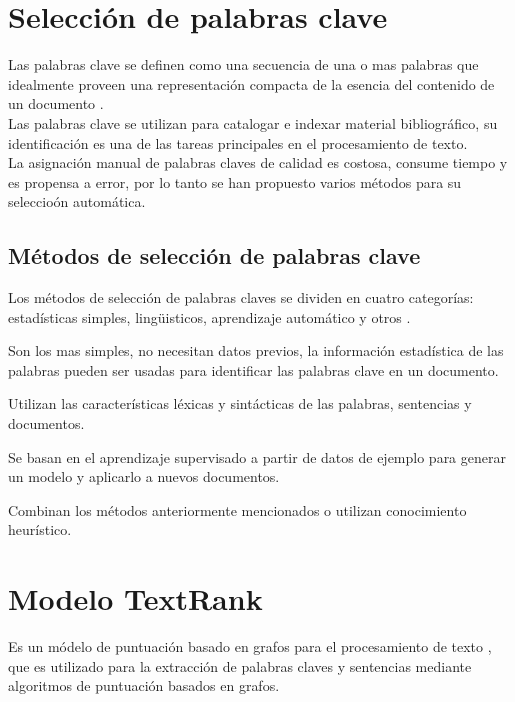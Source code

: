 \section{Selecci\'on de palabras clave}
Las palabras clave se definen como una secuencia de una o mas palabras que idealmente
proveen una representaci\'on compacta de la esencia del contenido de un 
documento \cite{REC10}. \\

Las palabras clave se utilizan para catalogar e indexar material bibliogr\'afico,
su identificaci\'on es una de las tareas principales en el procesamiento de texto. \\

La asignaci\'on manual de palabras claves de calidad es costosa, consume tiempo y es
propensa a error, por lo tanto se han propuesto varios m\'etodos para su seleccio\'on
autom\'atica.

\subsection{M\'etodos de selecci\'on de palabras clave}
Los m\'etodos de selecci\'on de palabras claves se dividen en cuatro categor\'ias:
estad\'isticas simples, ling\"uisticos, aprendizaje autom\'atico y otros \cite{ZWW08}.
\begin{description}[leftmargin=0cm]
	\item[Enfoques estad\'isticos] Son los mas simples, no necesitan datos previos,
	la informaci\'on estad\'istica de las palabras pueden ser usadas para identificar
	las palabras clave en un documento.
	\item[Enfoques ling\"uisticos] Utilizan las caracter\'isticas l\'exicas y
	sint\'acticas de las palabras, sentencias y documentos.
	\item[Enfoques de aprendizaje autom\'atico] Se basan en el aprendizaje supervisado
	a partir de datos de ejemplo para generar un modelo y aplicarlo a nuevos
	documentos.
	\item[Otros enfoques] Combinan los m\'etodos anteriormente mencionados o utilizan
	conocimiento heur\'istico.
\end{description}

\section{Modelo TextRank}
Es un m\'odelo de puntuaci\'on basado en grafos para el procesamiento de
texto \cite{RMPT04}, que es utilizado para la extracci\'on de palabras claves
y sentencias mediante algoritmos de puntuaci\'on basados en grafos.

